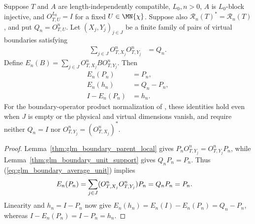\begin{lemma}
    \label{thm:glm_boundary_projection_average}
    \leanok
    Suppose $T$ and $A$ are length-independently compatible, $L_0,n>0$,
    $A$ is $L_0$-block injective, and $O^{L_0}_{T,U}=I$ for a fixed
    $U\in\MN{\chi}$. Suppose also
    $\mathcal R_n(T)^*=\mathcal R_n(T)$, and put $Q_n=O^n_{T,U}$.
    Let $(X_j,Y_j)_{j\in J}$ be a finite family of pairs of virtual
    boundaries satisfying
    \begin{align}
        \sum_{j\in J}O^n_{T,X_j}O^n_{T,Y_j} & =Q_n.
        \label{eq:glm_boundary_average_unit}
    \end{align}
    Define $E_n(B)=\sum_{j\in J}O^n_{T,X_j}BO^n_{T,Y_j}$.
    Then
    \begin{align}
        E_n(P_n)   & =P_n, \label{eq:glm_boundary_support_average}    \\
        E_n(h_n)   & =Q_n-P_n, \label{eq:glm_boundary_parent_average} \\
        I-E_n(P_n) & =h_n. \label{eq:glm_boundary_ambient_complement}
    \end{align}
    For the boundary-operator product normalization of
    \cite[Appendix~B]{GarreRubio2023MPOSym}, these identities hold even when
    $J$ is empty or the physical and virtual dimensions vanish, and require
    neither $Q_n=I$ nor $O^n_{T,Y_j}=(O^n_{T,X_j})^*$.
\end{lemma}
\begin{proof}
    \leanok
    Lemma~\ref{thm:glm_boundary_parent_local} gives
    $P_nO^n_{T,Y_j}=O^n_{T,Y_j}P_n$, while
    Lemma~\ref{thm:glm_boundary_unit_support} gives $Q_nP_n=P_n$.
    Thus (\ref{eq:glm_boundary_average_unit}) implies
    \begin{align}
        E_n(P_n)
         & =\sum_{j\in J}(O^n_{T,X_j}O^n_{T,Y_j})P_n
        =Q_nP_n=P_n. \notag
    \end{align}
    Linearity and $h_n=I-P_n$ now give
    $E_n(h_n)=E_n(I)-E_n(P_n)=Q_n-P_n$, whereas
    $I-E_n(P_n)=I-P_n=h_n$.
\end{proof}

